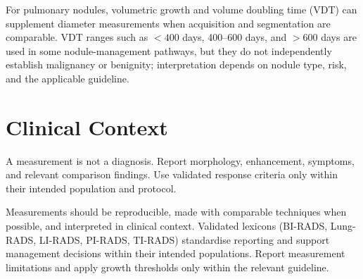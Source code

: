 \begin{pearlbox}
For pulmonary nodules, volumetric growth and volume doubling time (VDT) can supplement diameter measurements when acquisition and segmentation are comparable. VDT ranges such as $<400$ days, 400--600 days, and $>600$ days are used in some nodule-management pathways, but they do not independently establish malignancy or benignity; interpretation depends on nodule type, risk, and the applicable guideline.
\end{pearlbox}

\section{Clinical Context}
A measurement is not a diagnosis. Report morphology, enhancement, symptoms, and relevant comparison findings. Use validated response criteria only within their intended population and protocol.

\begin{pearlbox}[Impression:]
Measurements should be reproducible, made with comparable techniques when possible, and interpreted in clinical context. Validated lexicons (BI-RADS, Lung-RADS, LI-RADS, PI-RADS, TI-RADS) standardise reporting and support management decisions within their intended populations. Report measurement limitations and apply growth thresholds only within the relevant guideline.
\end{pearlbox}

\clearpage
